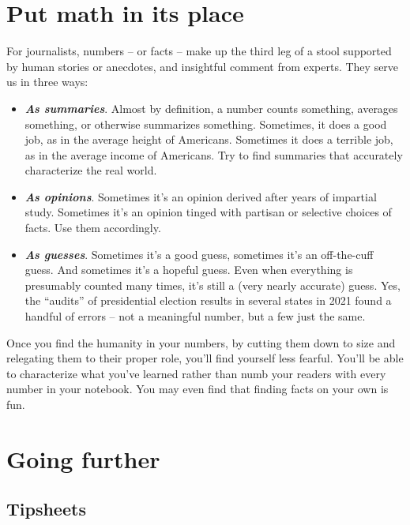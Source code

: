 \documentclass[
  letterpaper,
  DIV=11,
  numbers=noendperiod]{scrreprt}
\begin{document}
\hypertarget{put-math-in-its-place}{%
\section{Put math in its place}\label{put-math-in-its-place}}

For journalists, numbers -- or facts -- make up the third leg of a stool
supported by human stories or anecdotes, and insightful comment from
experts. They serve us in three ways:

\begin{itemize}
\item
  \textbf{\emph{As summaries}}. Almost by definition, a number counts
  something, averages something, or otherwise summarizes something.
  Sometimes, it does a good job, as in the average height of Americans.
  Sometimes it does a terrible job, as in the average income of
  Americans. Try to find summaries that accurately characterize the real
  world.
\item
  \textbf{\emph{As opinions}}. Sometimes it's an opinion derived after
  years of impartial study. Sometimes it's an opinion tinged with
  partisan or selective choices of facts. Use them accordingly.
\item
  \textbf{\emph{As guesses}}. Sometimes it's a good guess, sometimes
  it's an off-the-cuff guess. And sometimes it's a hopeful guess. Even
  when everything is presumably counted many times, it's still a (very
  nearly accurate) guess. Yes, the ``audits'' of presidential election
  results in several states in 2021 found a handful of errors -- not a
  meaningful number, but a few just the same.
\end{itemize}

Once you find the humanity in your numbers, by cutting them down to size
and relegating them to their proper role, you'll find yourself less
fearful. You'll be able to characterize what you've learned rather than
numb your readers with every number in your notebook. You may even find
that finding facts on your own is fun.

\hypertarget{going-further}{%
\section{Going further}\label{going-further}}

\hypertarget{tipsheets}{%
\subsection*{Tipsheets}\label{tipsheets}}
\end{document}

